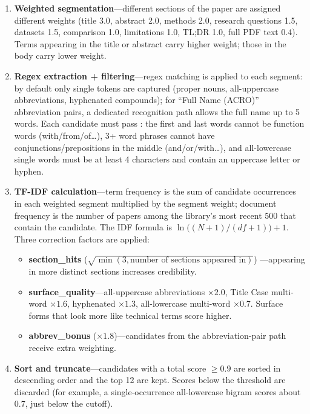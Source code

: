 \begin{enumerate}
  \item \textbf{Weighted segmentation}---different sections of the paper are assigned
    different weights (title 3.0, abstract 2.0, methods 2.0, research questions 1.5,
    datasets 1.5, comparison 1.0, limitations 1.0, TL;DR 1.0, full PDF text 0.4).
    Terms appearing in the title or abstract carry higher weight; those in the body
    carry lower weight.
  \item \textbf{Regex extraction + filtering}---regex matching is applied to each
    segment: by default only single tokens are captured (proper nouns, all-uppercase
    abbreviations, hyphenated compounds); for ``Full Name (ACRO)'' abbreviation pairs,
    a dedicated recognition path allows the full name up to 5 words. Each candidate
    must pass : the first and last words cannot be function
    words (with/from/of\ldots), 3+ word phrases cannot have conjunctions/prepositions
    in the middle (and/or/with\ldots), and all-lowercase single words must be at least
    4 characters and contain an uppercase letter or hyphen.
  \item \textbf{TF-IDF calculation}---term frequency is the sum of candidate
    occurrences in each weighted segment multiplied by the segment weight; document
    frequency is the number of papers among the library's most recent 500 that contain
    the candidate. The IDF formula is $\ln\!\bigl((N+1)/(df+1)\bigr) + 1$. Three
    correction factors are applied:
    \begin{itemize}
      \item \textbf{section\_hits} ($\sqrt{\min(3, \text{number of sections appeared in})}$)
        ---appearing in more distinct sections increases credibility.
      \item \textbf{surface\_quality}---all-uppercase abbreviations $\times 2.0$,
        Title Case multi-word $\times 1.6$, hyphenated $\times 1.3$,
        all-lowercase multi-word $\times 0.7$. Surface forms that look more like
        technical terms score higher.
      \item \textbf{abbrev\_bonus} ($\times 1.8$)---candidates from the abbreviation-pair
        path receive extra weighting.
    \end{itemize}
  \item \textbf{Sort and truncate}---candidates with a total score $\geq 0.9$ are sorted
    in descending order and the top 12 are kept. Scores below the threshold are discarded
    (for example, a single-occurrence all-lowercase bigram scores about 0.7, just below
    the cutoff).
\end{enumerate}

